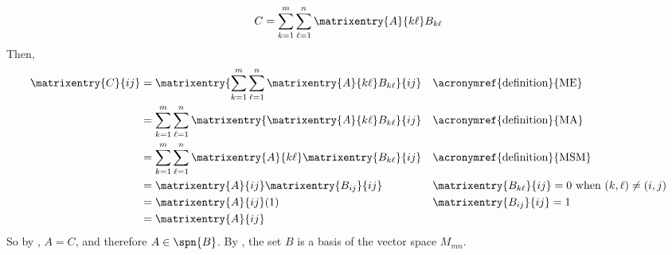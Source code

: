 %
\begin{equation*}
C=\sum_{k=1}^{m}\sum_{\ell=1}^{n}\matrixentry{A}{k\ell}B_{k\ell}
\end{equation*}
%
Then,
%
\begin{align*}
\matrixentry{C}{ij}
&=\matrixentry{\sum_{k=1}^{m}\sum_{\ell=1}^{n}\matrixentry{A}{k\ell}B_{k\ell}}{ij}
&&\text{\acronymref{definition}{ME}}\\
%
&=\sum_{k=1}^{m}\sum_{\ell=1}^{n}\matrixentry{\matrixentry{A}{k\ell}B_{k\ell}}{ij}
&&\text{\acronymref{definition}{MA}}\\
%
&=\sum_{k=1}^{m}\sum_{\ell=1}^{n}\matrixentry{A}{k\ell}\matrixentry{B_{k\ell}}{ij}
&&\text{\acronymref{definition}{MSM}}\\
%
&=\matrixentry{A}{ij}\matrixentry{B_{ij}}{ij}
&&\text{$\matrixentry{B_{k\ell}}{ij}=0$ when $(k,\ell)\neq(i,j)$}\\
%
&=\matrixentry{A}{ij}(1)&&\text{$\matrixentry{B_{ij}}{ij}=1$}\\
%
&=\matrixentry{A}{ij}
\end{align*}
%
So by , $A=C$, and therefore $A\in\spn{B}$.  By , the set $B$ is a basis of the vector space $M_{mn}$.
